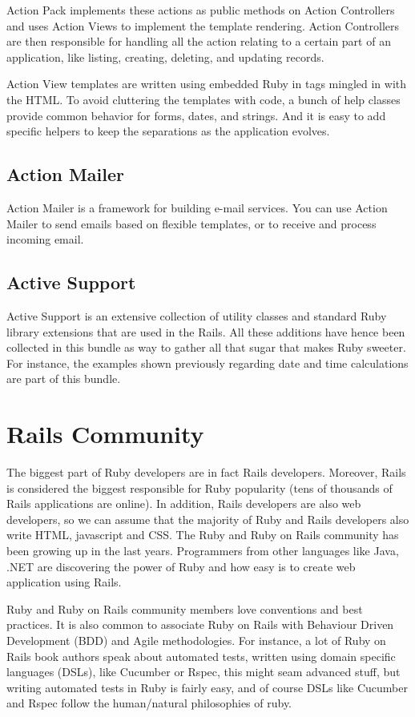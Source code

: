 Action Pack implements these actions as public methods on Action Controllers and uses Action Views to implement the template rendering. Action Controllers are then responsible for handling all the action relating to a certain part of an application, 
like listing, creating, deleting, and updating records.

Action View templates are written using embedded Ruby in tags mingled in with the HTML. 
To avoid cluttering the templates with code, a bunch of help classes provide common behavior for forms, dates, and strings. 
And it is easy to add specific helpers to keep the separations as the application evolves.


\subsection{Action Mailer}  
Action Mailer is a framework for building e-mail services. You can use Action Mailer to send emails based on flexible templates, or to receive and process incoming email.


\subsection{Active Support} 
Active Support is an extensive collection of utility classes and standard Ruby library extensions that are used in the Rails. 
All these additions have hence been collected in this bundle as way to gather all that sugar that makes Ruby sweeter. 
For instance, the examples shown previously regarding date and time calculations are part of this bundle.


\section{Rails Community} 
The biggest part of Ruby developers are in fact Rails developers. 
Moreover, Rails is considered the biggest responsible for Ruby popularity
(tens of thousands of Rails applications are online).
In addition, Rails developers are also web developers, 
so we can assume that the majority of Ruby and Rails developers also write HTML, javascript and CSS.
The Ruby and Ruby on Rails community has been growing up in the last years. 
Programmers from other languages like Java, .NET are discovering the power of Ruby and how easy is 
to create web application using Rails.

Ruby and Ruby on Rails community members love conventions and best practices.
It is also common to associate Ruby on Rails with Behaviour Driven Development (BDD) and Agile methodologies.
For instance, a lot of Ruby on Rails book authors speak about automated tests, 
written using domain specific languages (DSLs), like Cucumber or Rspec, 
this might seam advanced stuff, but writing automated tests in Ruby is fairly easy,
and of course DSLs like Cucumber and Rspec follow the human/natural philosophies of ruby.

